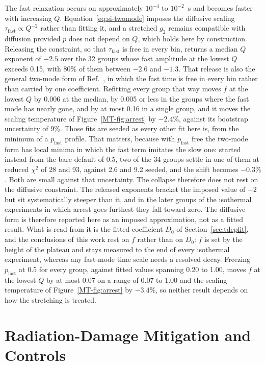 \documentclass[11pt]{article}
\begin{document}
The fast relaxation occurs on approximately $10^{-4}$ to $10^{-2}$~s and becomes faster with increasing $Q$. Equation~\ref{eq:si-twomode} imposes the diffusive scaling $\tau_{\mathrm{fast}}\propto Q^{-2}$ rather than fitting it, and a stretched $g_2$ remains compatible with diffusion provided $p$ does not depend on $Q$, which holds here by construction. Releasing the constraint, so that $\tau_{\mathrm{fast}}$ is free in every bin, returns a median $Q$ exponent of $-2.5$ over the 32 groups whose fast amplitude at the lowest $Q$ exceeds 0.15, with 80\% of them between $-2.6$ and $-1.3$. That release is also the general two-mode form of Ref.~, in which the fast time is free in every bin rather than carried by one coefficient. Refitting every group that way moves $f$ at the lowest $Q$ by 0.006 at the median, by 0.005 or less in the groups where the fast mode has nearly gone, and by at most 0.16 in a single group, and it moves the scaling temperature of Figure~\ref*{MT-fig:arrest} by $-2.4\%$, against its bootstrap uncertainty of 9\%. Those fits are seeded as every other fit here is, from the minimum of a $p_{\mathrm{fast}}$ profile. That matters, because with $p_{\mathrm{fast}}$ free the two-mode form has local minima in which the fast term imitates the slow one: started instead from the bare default of 0.5, two of the 34 groups settle in one of them at reduced $\chi^2$ of 28 and 93, against 2.6 and 9.2 seeded, and the shift becomes $-0.3\%$. Both are small against that uncertainty. The collapse therefore does not rest on the diffusive constraint. The released exponents bracket the imposed value of $-2$ but sit systematically steeper than it, and in the later groups of the isothermal experiments in which arrest goes furthest they fall toward zero. The diffusive form is therefore reported here as an imposed approximation, not as a fitted result. What is read from it is the fitted coefficient $D_0$ of Section~\ref{sec:tdepfit}, and the conclusions of this work rest on $f$ rather than on $D_0$: $f$ is set by the height of the plateau and stays measured to the end of every isothermal experiment, whereas any fast-mode time scale needs a resolved decay. Freezing $p_{\mathrm{fast}}$ at 0.5 for every group, against fitted values spanning 0.20 to 1.00, moves $f$ at the lowest $Q$ by at most 0.07 on a range of 0.07 to 1.00 and the scaling temperature of Figure~\ref*{MT-fig:arrest} by $-3.4\%$, so neither result depends on how the stretching is treated.

\section{Radiation-Damage Mitigation and Controls}
\label{sec:radiation}
\end{document}
